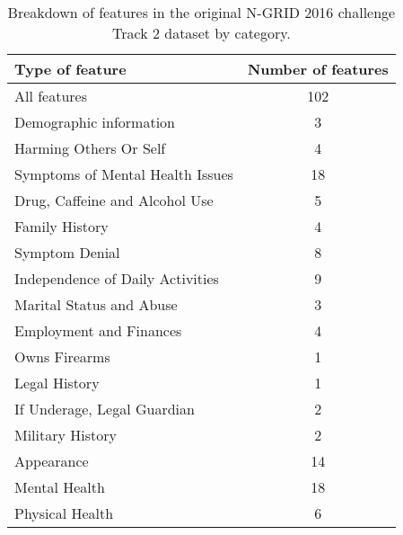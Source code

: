 
\begin{table}[]
    \centering
    \begin{tabular}{|l|c|}
    \hline
    \textsf{Type of feature} & \textsf{Number of features}  \\
    \hline
    \textsf{All features} &       102      \\ 
    \hline
    \textsf{Demographic information} & 3  \\
    \textsf{Harming Others Or Self} & 4 \\
    \textsf{Symptoms of Mental Health Issues} & 18 \\ %
    \textsf{Drug, Caffeine and Alcohol Use} & 5 \\
    \textsf{Family History} & 4 \\
    \textsf{Symptom Denial} & 8 \\
    \textsf{Independence of Daily Activities} & 9 \\
    \textsf{Marital Status and Abuse} & 3 \\
    \textsf{Employment and Finances} & 4 \\
    \textsf{Owns Firearms} & 1 \\
    \textsf{Legal History} & 1 \\
    \textsf{If Underage, Legal Guardian} & 2 \\
    \textsf{Military History} & 2 \\
    \textsf{Appearance} & 14 \\
    \textsf{Mental Health} & 18 \\
    \textsf{Physical Health} & 6 \\
    \hline

    \end{tabular}
    \caption{Breakdown of features in the original N-GRID 2016 challenge Track 2 dataset by category.}
    \label{tab:data2}
    \end{table}
  
